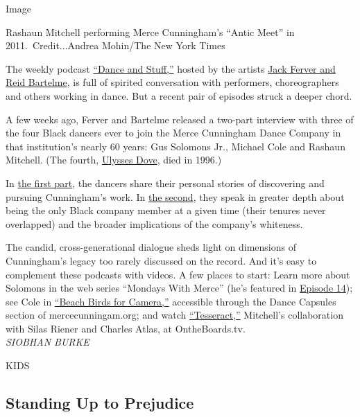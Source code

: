 Image

Rashaun Mitchell performing Merce Cunningham's ``Antic Meet'' in
2011.~Credit...Andrea Mohin/The New York Times

The weekly podcast \href{https://www.danceandstuff.com/}{``Dance and
Stuff,''} hosted by the artists
\href{https://www.nytimes.com/2020/05/05/arts/dance/reid-bartelme-jack-ferver-podcast.html}{Jack
Ferver and Reid Bartelme}, is full of spirited conversation with
performers, choreographers and others working in dance. But a recent
pair of episodes struck a deeper chord.

A few weeks ago, Ferver and Bartelme released a two-part interview with
three of the four Black dancers ever to join the Merce Cunningham Dance
Company in that institution's nearly 60 years: Gus Solomons Jr., Michael
Cole and Rashaun Mitchell. (The fourth,
\href{https://charlierose.com/videos/15779}{Ulysses Dove}, died in
1996.)

In
\href{https://anchor.fm/danceandstuff/episodes/Episode-159-With-Gus-Solomons--Jr---Michael-Cole--and-Rashaun-Mitchell-eg322s}{the
first part}, the dancers share their personal stories of discovering and
pursuing Cunningham's work. In
\href{https://anchor.fm/danceandstuff/episodes/Episode-160-Dancing-for-Merce-Cunningham-eg7ed4}{the
second}, they speak in greater depth about being the only Black company
member at a given time (their tenures never overlapped) and the broader
implications of the company's whiteness.

The candid, cross-generational dialogue sheds light on dimensions of
Cunningham's legacy too rarely discussed on the record. And it's easy to
complement these podcasts with videos. A few places to start: Learn more
about Solomons in the web series ``Mondays With Merce'' (he's featured
in \href{https://www.youtube.com/watch?v=_rRKRX0U6NA}{Episode 14}); see
Cole in
\href{https://dancecapsules.mercecunningham.org/overview.cfm?capid=46030}{``Beach
Birds for Camera,''} accessible through the Dance Capsules section of
mercecunningam.org; and watch
\href{https://www.ontheboards.tv/performances/tesseract-o}{``Tesseract,''}
Mitchell's collaboration with Silas Riener and Charles Atlas, at
OntheBoards.tv.\\
\emph{SIOBHAN BURKE}

KIDS

\hypertarget{standing-up-to-prejudice}{%
\subsection{Standing Up to Prejudice}\label{standing-up-to-prejudice}}

